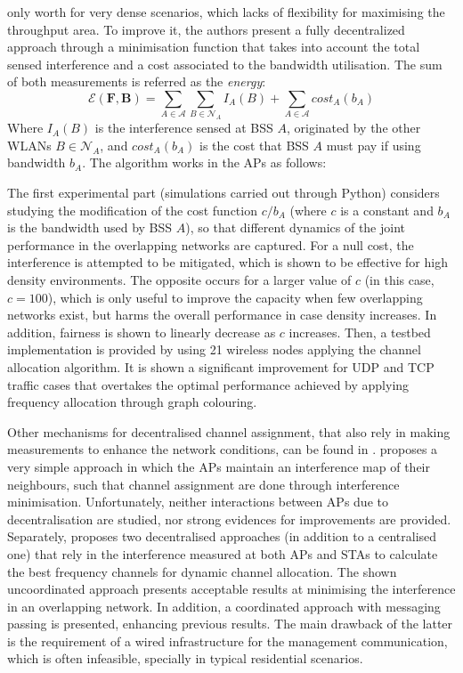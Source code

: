 \documentclass[12pt, a4paper,twoside]{tesi_upf}
\begin{document}
only worth for very dense scenarios, which lacks of flexibility for maximising the throughput area. To improve it, the authors present a fully decentralized approach through a minimisation function that takes into account the total sensed interference and a cost associated to the bandwidth utilisation. The sum of both measurements is referred as the \textit{energy}:
		\begin{equation}
		\mathcal{E} (\textbf{F},\textbf{B}) = \sum_{A \in \mathcal{A}} \sum_{B \in \mathcal{N}_A} I_A (B) + \sum_{A \in \mathcal{A}} cost_A (b_A)
		\end{equation}
		Where $I_A (B)$ is the interference sensed at BSS $A$, originated by the other WLANs $B \in \mathcal{N}_A$, and $cost_A (b_A)$ is the cost that BSS $A$ must pay if using bandwidth $b_A$. The algorithm works in the APs as follows:
		\begin{figure}[h!]
			\centering
			\label{fig:saw_alg}
		\end{figure}	
		
		The first experimental part (simulations carried out through Python) considers studying the modification of the cost function $c/b_A$ (where $c$ is a constant and $b_A$ is the bandwidth used by BSS $A$), so that different dynamics of the joint performance in the overlapping networks are captured. For a null cost, the interference is attempted to be mitigated, which is shown to be effective for high density environments. The opposite occurs for a larger value of $c$ (in this case, $c=100$), which is only useful to improve the capacity when few overlapping networks exist, but harms the overall performance in case density increases. In addition, fairness is shown to linearly decrease as $c$ increases. Then, a testbed implementation is provided by using 21 wireless nodes applying the channel allocation algorithm. It is shown a significant improvement for UDP and TCP traffic cases that overtakes the optimal performance achieved by applying frequency allocation through graph colouring.
		
		Other mechanisms for decentralised channel assignment, that also rely in making measurements to enhance the network conditions, can be found in \cite{akl2007dynamic, chen2007improved}. \cite{akl2007dynamic} proposes a very simple approach in which the APs maintain an interference map of their neighbours, such that channel assignment are done through interference minimisation. Unfortunately, neither interactions between APs due to decentralisation are studied, nor strong evidences for improvements are provided. Separately, \cite{chen2007improved} proposes two decentralised approaches (in addition to a centralised one) that rely in the interference measured at both APs and STAs to calculate the best frequency channels for dynamic channel allocation. The shown uncoordinated approach presents acceptable results at minimising the interference in an overlapping network. In addition, a coordinated approach with messaging passing is presented, enhancing previous results. The main drawback of the latter is the requirement of a wired infrastructure for the management communication, which is often infeasible, specially in typical residential scenarios. 	
		
\end{document}
